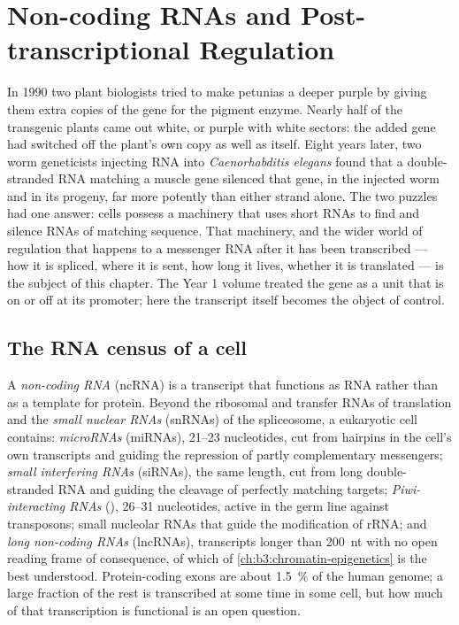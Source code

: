 \chapter{Non-coding RNAs and Post-transcriptional Regulation}\label{ch:b3:rna-regulation}

In 1990 two plant biologists tried to make petunias a deeper purple by
giving them extra copies of the gene for the pigment enzyme. Nearly half
of the transgenic plants came out white, or purple with white sectors:
the added gene had switched off the plant's own copy as well as itself.
Eight years later, two worm geneticists injecting RNA into
\emph{Caenorhabditis elegans} found that a double-stranded RNA matching
a muscle gene silenced that gene, in the injected worm and in its
progeny, far more potently than either strand alone. The two puzzles
had one answer: cells possess a machinery that uses short RNAs to find
and silence RNAs of matching sequence. That machinery, and the wider
world of regulation that happens to a messenger RNA after it has been
transcribed --- how it is spliced, where it is sent, how long it lives,
whether it is translated --- is the subject of this chapter. The Year 1
volume treated the gene as a unit that is on or off at its promoter;
here the transcript itself becomes the object of control.

\section{The RNA census of a cell}

\begin{definition}\label{def:b3:rna-regulation:ncrna}
A \emph{non-coding RNA} (ncRNA) is a transcript that functions as RNA
rather than as a template for protein. Beyond the ribosomal and
transfer RNAs of translation and the \emph{small nuclear RNAs} (snRNAs)
of the spliceosome, a eukaryotic cell contains: \emph{microRNAs}
(miRNAs), \numrange{21}{23} nucleotides, cut from hairpins in the cell's
own transcripts and guiding the repression of partly complementary
messengers; \emph{small interfering RNAs} (siRNAs), the same length,
cut from long double-stranded RNA and guiding the cleavage of perfectly
matching targets; \emph{Piwi-interacting RNAs} (),
\numrange{26}{31} nucleotides, active in the germ line against
transposons; small nucleolar RNAs that guide the modification of rRNA;
and \emph{long non-coding RNAs} (lncRNAs), transcripts longer than
\qty{200}{nt} with no open reading frame of consequence, of which
\emph{} of \cref{ch:b3:chromatin-epigenetics} is the best
understood. Protein-coding exons are about \qty{1.5}{\%} of the human
genome; a large fraction of the rest is transcribed at some time in
some cell, but how much of that transcription is functional is an open
question.
\end{definition}

